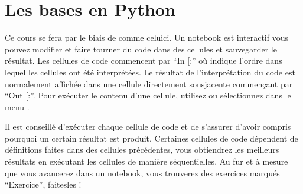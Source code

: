 \documentclass[letterpaper,10pt,english]{sphinxmanual}
\begin{document}
\section{Les bases en Python}
\label{\detokenize{src/OCI01_Introduction:les-bases-en-python}}
Ce cours se fera par le biais de  comme celui\sphinxhyphen{}ci.
Un notebook est interactif \sphinxhyphen{} vous pouvez modifier et faire tourner du code dans des cellules et sauvegarder le résultat.
Les cellules de code commencent par “In {[}\sphinxstyleemphasis{n}{]}:” où  indique l’ordre dans lequel les cellules ont été interprétées. Le résultat de l’interprétation du code est normalement affichée dans une cellule directement sous\sphinxhyphen{}jacente commençant par “Out {[}\sphinxstyleemphasis{n}{]}:”. Pour exécuter le contenu d’une cellule, utilisez  ou sélectionnez  dans le menu .

Il est conseillé d’exécuter chaque cellule de code et de s’assurer d’avoir compris pourquoi un certain résultat est produit. Certaines cellules de code dépendent de définitions faites dans des cellules précédentes, vous obtiendrez les meilleurs résultats en exécutant les cellules de manière séquentielles. Au fur et à mesure que vous avancerez dans un notebook, vous trouverez des exercices marqués “Exercice”, faites\sphinxhyphen{}les !
\end{document}
